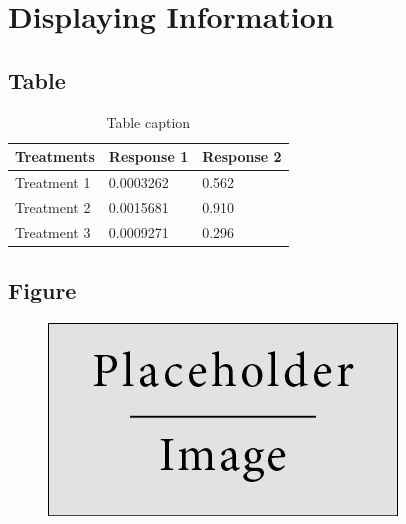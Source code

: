 \section{Displaying Information}
\label{section2}
\renewcommand*{\runninghead}{\nameref{section2}}

\clearpage


\subsection{Table}

\begin{table}[h]
    \centering
    \begin{tabular}{l l l}
        \toprule
        \textbf{Treatments} & \textbf{Response 1} & \textbf{Response 2}\\
        \midrule
        Treatment 1 & 0.0003262 & 0.562 \\
        Treatment 2 & 0.0015681 & 0.910 \\
        Treatment 3 & 0.0009271 & 0.296 \\
        \bottomrule
    \end{tabular}
    \caption{Table caption}
\end{table}

\clearpage


\subsection{Figure}

\begin{figure}[h]
    \centering
    \includegraphics[width=0.4\linewidth]{Figures/placeholder}
\end{figure}

\clearpage


